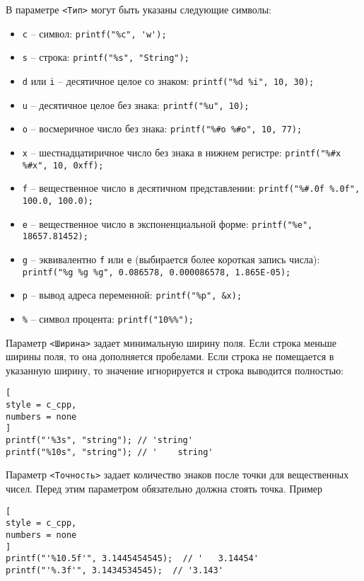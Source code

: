 \documentclass[%
	11pt,
	a4paper,
	utf8,
		]{article}
\begin{document}
В параметре \verb|<Тип>| могут быть указаны следующие символы:
\begin{itemize}
	\item \verb*|c| -- символ: \verb|printf("%c", 'w');|
	
	\item \verb*|s| -- строка: \verb|printf("%s", "String");|
	
	\item \verb*|d| или \verb|i| -- десятичное целое со знаком: \verb|printf("%d %i", 10, 30);|
	
	\item \verb|u| -- десятичное целое без знака: \verb|printf("%u", 10);|
	
	\item \verb|o| -- восмеричное число без знака: \verb|printf("%#o %#o", 10, 77);|
	
	\item \verb|x| -- шестнадцатиричное число без знака в нижнем регистре: \verb|printf("%#x %#x", 10, 0xff);|
	
	\item \verb|f| -- вещественное число в десятичном представлении: \verb|printf("%#.0f %.0f", 100.0, 100.0);|
	
	\item \verb*|e| -- вещественное число в экспоненциальной форме: \verb|printf("%e", 18657.81452);|
	
	\item \verb|g| -- эквивалентно \verb*|f| или \verb|e| (выбирается более короткая запись числа):\\ \verb|printf("%g %g %g", 0.086578, 0.000086578, 1.865E-05);|
	
	\item \verb|p| -- вывод адреса переменной: \verb|printf("%p", &x);|
	
	\item \verb*|%| -- символ процента: \verb|printf("10%%");|
\end{itemize}

Параметр \verb|<Ширина>| задает минимальную ширину поля. Если строка меньше ширины поля, то она дополняется пробелами. Если строка не помещается в указанную ширину, то значение игнорируется и строка выводится полностью:
\begin{lstlisting}[
style = c_cpp,
numbers = none
]
printf("'%3s", "string"); // 'string'
printf("%10s", "string"); // '    string'
\end{lstlisting}

Параметр \verb*|<Точность>| задает количество знаков после точки для вещественных чисел. Перед этим параметром обязательно должна стоять точка. Пример
\begin{lstlisting}[
style = c_cpp,
numbers = none
]
printf("'%10.5f'", 3.1445454545);  // '   3.14454'
printf("'%.3f'", 3.1434534545);  // '3.143'
\end{lstlisting}
\end{document}
